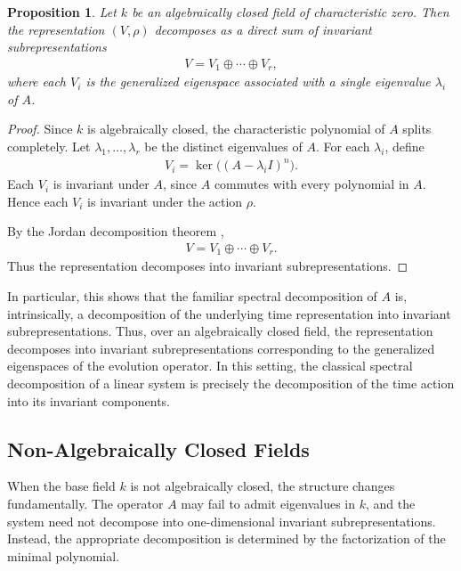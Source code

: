 \documentclass[letterpaper, 9pt, conference]{ieeeconf}
\newtheorem{proposition}[theorem]{Proposition}
\begin{document}
\begin{proposition}
Let $k$ be an algebraically closed field of characteristic zero. Then the
representation $(V,\rho)$ decomposes as a direct sum of invariant
subrepresentations
\begin{eqnarray}
V = V_1 \oplus \cdots \oplus V_r,
\end{eqnarray}
where each \(V_i\) is the generalized eigenspace associated with a single
eigenvalue \(\lambda_i\) of \(A\).
\end{proposition}

\begin{proof}
Since $k$ is algebraically closed, the characteristic polynomial of $A$
splits completely. Let $\lambda_1,\dots,\lambda_r$ be the distinct eigenvalues
of $A$. For each $\lambda_i$, define
\begin{eqnarray}
V_i = \ker\big((A - \lambda_i I)^n\big).
\end{eqnarray}
Each $V_i$ is invariant under $A$, since $A$ commutes with every polynomial in
$A$. Hence each $V_i$ is invariant under the action $\rho$.

By the Jordan decomposition theorem
\cite{serre_linear_representation_book},
\begin{eqnarray*}
V = V_1 \oplus \cdots \oplus V_r.
\end{eqnarray*}
Thus the representation decomposes into invariant subrepresentations.
\end{proof}

In particular, this shows that the familiar spectral decomposition of \(A\) is, intrinsically, a decomposition of the underlying time representation into invariant subrepresentations. Thus, over an algebraically closed field, the representation decomposes into
invariant subrepresentations corresponding to the generalized eigenspaces of
the evolution operator. In this setting, the classical spectral decomposition
of a linear system is precisely the decomposition of the time action into its
invariant components.

\subsection{Non-Algebraically Closed Fields}

When the base field $k$ is not algebraically closed, the structure changes
fundamentally. The operator $A$ may fail to admit eigenvalues in $k$, and the
system need not decompose into one-dimensional invariant subrepresentations.
Instead, the appropriate decomposition is determined by the factorization of the
minimal polynomial.
\end{document}
